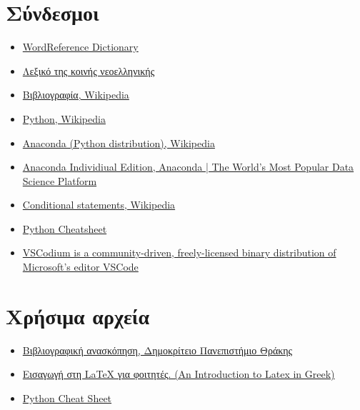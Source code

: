 \documentclass[14pt]{extreport}
\begin{document}
\section{Σύνδεσμοι}
\begin{itemize}
    \item \href{https://tinyurl.com/yyzfa2bg}{WordReference Dictionary}
    \item \href{https://tinyurl.com/o5vxal7}{Λεξικό της κοινής νεοελληνικής}
    \item \href{https://tinyurl.com/y9q2elk4}{Βιβλιογραφία, Wikipedia}
    \item \href{https://tinyurl.com/y9g9nkh2}{Python, Wikipedia}
    \item \href{https://tinyurl.com/ycy6jsw5}{Anaconda (Python distribution),
              Wikipedia}
    \item \href{https://tinyurl.com/y7rogsec}{Anaconda Individiual Edition,
              Anaconda | The World's Most Popular Data Science Platform}
    \item \href{https://tinyurl.com/ogoqf2p}{Conditional statements, Wikipedia}
    \item \href{https://tinyurl.com/y8y59y44}{Python Cheatsheet}
    \item \href{https://tinyurl.com/y54gclet}{VSCodium is a community-driven,
              freely-licensed binary distribution of Microsoft’s editor VSCode}
\end{itemize}
\section{Χρήσιμα αρχεία}
\begin{itemize}
    \item \href{https://tinyurl.com/y9l8o5n6}{Βιβλιογραφική ανασκόπηση,
              Δημοκρίτειο Πανεπιστήμιο Θράκης}
    \item \href{https://tinyurl.com/yaaswz5p}{Εισαγωγή στη LaTeX για φοιτητές.
              (An Introduction to Latex in Greek)}
    \item \href{https://tinyurl.com/nqbrvss}{Python Cheat Sheet}
\end{itemize}
\end{document}
